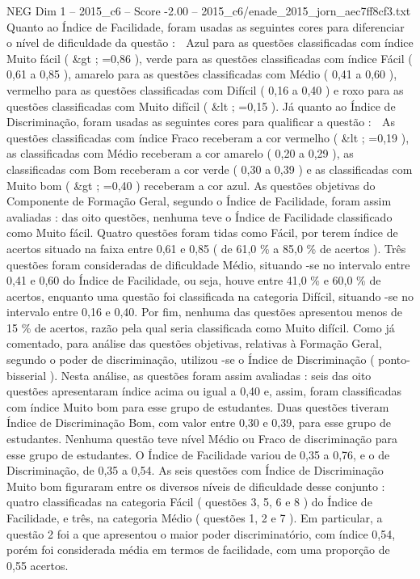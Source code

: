 \begin{textsample}{NEG Dim 1 – 2015\_c6 – Score -2.00 – 2015\_c6/enade\_2015\_jorn\_aec7ff8cf3.txt}
Quanto ao Índice de Facilidade, foram usadas as seguintes cores para diferenciar o nível de dificuldade da questão :  Azul para as questões classificadas com índice Muito fácil ( \&gt ; =0,86 ), verde para as questões classificadas com índice Fácil ( 0,61 a 0,85 ), amarelo para as questões classificadas com Médio ( 0,41 a 0,60 ), vermelho para as questões classificadas com Difícil ( 0,16 a 0,40 ) e roxo para as questões classificadas com Muito difícil ( \&lt ; =0,15 ).
Já quanto ao Índice de Discriminação, foram usadas as seguintes cores para qualificar a questão :  As questões classificadas com índice Fraco receberam a cor vermelho ( \&lt ; =0,19 ), as classificadas com Médio receberam a cor amarelo ( 0,20 a 0,29 ), as classificadas com Bom receberam a cor verde ( 0,30 a 0,39 ) e as classificadas com Muito bom ( \&gt ; =0,40 ) receberam a cor azul.
As questões objetivas do Componente de Formação Geral, segundo o Índice de Facilidade, foram assim avaliadas : das oito questões, nenhuma teve o Índice de Facilidade classificado como Muito fácil.
Quatro questões foram tidas como Fácil, por terem índice de acertos situado na faixa entre 0,61 e 0,85 ( de 61,0 \% a 85,0 \% de acertos ).
Três questões foram consideradas de dificuldade Médio, situando -se no intervalo entre 0,41 e 0,60 do Índice de Facilidade, ou seja, houve entre 41,0 \% e 60,0 \% de acertos, enquanto uma questão foi classificada na categoria Difícil, situando -se no intervalo entre 0,16 e 0,40.
Por fim, nenhuma das questões apresentou menos de 15 \% de acertos, razão pela qual seria classificada como Muito difícil.
Como já comentado, para análise das questões objetivas, relativas à Formação Geral, segundo o poder de discriminação, utilizou -se o Índice de Discriminação ( ponto- bisserial ).
Nesta análise, as questões foram assim avaliadas : seis das oito questões apresentaram índice acima ou igual a 0,40 e, assim, foram classificadas com índice Muito bom para esse grupo de estudantes.
Duas questões tiveram Índice de Discriminação Bom, com valor entre 0,30 e 0,39, para esse grupo de estudantes.
Nenhuma questão teve nível Médio ou Fraco de discriminação para esse grupo de estudantes.
O Índice de Facilidade variou de 0,35 a 0,76, e o de Discriminação, de 0,35 a 0,54.
As seis questões com Índice de Discriminação Muito bom figuraram entre os diversos níveis de dificuldade desse conjunto : quatro classificadas na categoria Fácil ( questões 3, 5, 6 e 8 ) do Índice de Facilidade, e três, na categoria Médio ( questões 1, 2 e 7 ).
Em particular, a questão 2 foi a que apresentou o maior poder discriminatório, com índice 0,54, porém foi considerada média em termos de facilidade, com uma proporção de 0,55 acertos.

\end{textsample}
